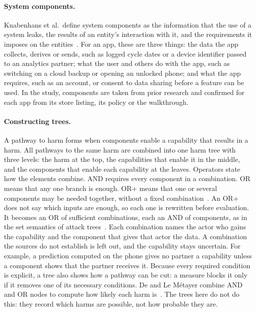 \paragraph{System components.} Knabenhans et al.\ define system components as
the information that the use of a system leaks, the results of an entity's
interaction with it, and the requirements it imposes on the
entities~\parencite[\S4.1]{knabenhans2026harms}. For an app, these are three
things: the data the app collects, derives or sends, such as logged cycle
dates or a device identifier passed to an analytics partner; what the user and
others do with the app, such as switching on a cloud backup or opening an
unlocked phone; and what the app requires, such as an account, or consent to
data sharing before a feature can be used. In the study, components are taken
from prior research and confirmed for each app from its store listing, its
policy or the walkthrough.

\paragraph{Constructing trees.} A pathway to harm forms when components enable a capability
that results in a harm. All pathways to the same harm are combined into one harm tree with
three levels: the harm at the top, the capabilities that enable it in the middle, and the
components that enable each capability at the leaves. Operators state how the elements
combine. AND requires every component in a combination. OR means that any one branch is
enough. OR+ means that one or several components may be needed together, without a fixed
combination~\parencite[\S4.1]{knabenhans2026harms}. An OR+ does not say which inputs are
enough, so each one is rewritten before evaluation. It becomes an OR of sufficient
combinations, each an AND of components, as in the set semantics of attack
trees~\parencite{mauw2005foundations}. Each combination names the actor who gains the
capability and the component that gives that actor the data. A combination the sources do not
establish is left out, and the capability stays uncertain. For example, a prediction computed
on the phone gives no partner a capability unless a component shows that the partner receives
it.
Because every required condition is explicit, a tree also shows how a pathway can be cut: a
measure blocks it only if it removes one of its necessary conditions. De and Le Métayer combine
AND and OR nodes to compute how likely each harm is~\parencite[Sec.~IV-B]{de2016privacy}. The
trees here do not do this: they record which harms are possible, not how probable they are.

